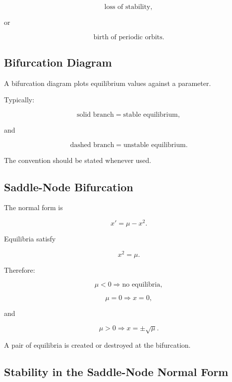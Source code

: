 \[
\boxed{
\text{loss of stability},
}
\]

or

\[
\boxed{
\text{birth of periodic orbits}.
}
\]

\subsection{Bifurcation Diagram}
\label{subsec:bifurcation-diagram}

A bifurcation diagram plots equilibrium values against a parameter.

Typically:

\[
\boxed{
\text{solid branch}
=
\text{stable equilibrium},
}
\]

and

\[
\boxed{
\text{dashed branch}
=
\text{unstable equilibrium}.
}
\]

The convention should be stated whenever used.

\subsection{Saddle-Node Bifurcation}
\label{subsec:saddle-node-bifurcation}

The normal form is

\[
\boxed{
x'
=
\mu-x^2.
}
\]

Equilibria satisfy

\[
x^2=\mu.
\]

Therefore:

\[
\mu<0
\Rightarrow
\text{no equilibria},
\]

\[
\mu=0
\Rightarrow
x=0,
\]

and

\[
\mu>0
\Rightarrow
x=\pm\sqrt{\mu}.
\]

A pair of equilibria is created or destroyed at the bifurcation.

\subsection{Stability in the Saddle-Node Normal Form}
\label{subsec:saddle-node-stability}

